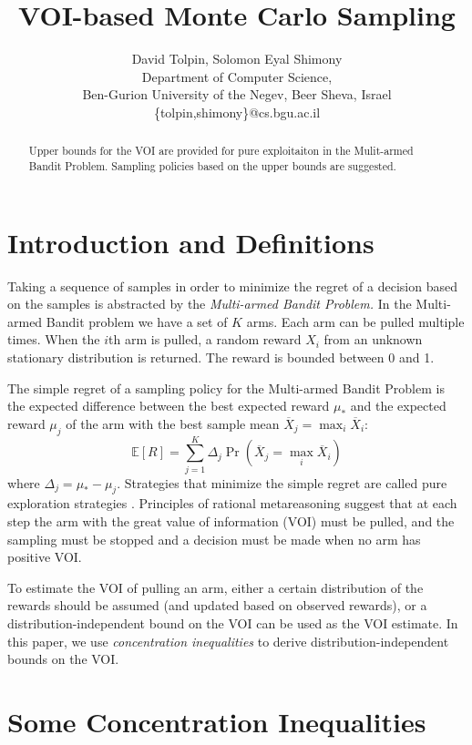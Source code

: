 \documentclass{article}
\title{VOI-based Monte Carlo Sampling}
\author {David Tolpin, Solomon Eyal Shimony \\
Department of Computer Science, \\
Ben-Gurion University of the Negev, Beer Sheva, Israel \\
\{tolpin,shimony\}@cs.bgu.ac.il}
\newcommand {\IE} {\ensuremath {\mathbb{E}}}
\begin{document}
\maketitle

\begin{abstract}
Upper bounds for the VOI are provided for pure exploitaiton in the
Mulit-armed Bandit Problem. Sampling policies based on the upper
bounds are suggested.
\end{abstract}

\section{Introduction and Definitions}

Taking a sequence of samples in order to minimize the
regret of a decision based on the samples is abstracted by the
{\em Multi-armed Bandit Problem.} In the Multi-armed Bandit problem
we have a set of $K$ arms. Each arm can be pulled multiple
times. When the $i$th arm is pulled, a random reward $X_i$ from an
unknown stationary distribution is returned.  The reward is bounded
between 0 and 1.

The simple regret of a sampling policy for the Multi-armed Bandit
Problem is the expected difference between the best expected reward
$\mu_*$ and the expected reward $\mu_j$ of the arm with the best sample mean
$\overline X_j=\max_i\overline X_i$:
\begin{equation}
\label{eq:simple-regret}
\IE[R]=\sum_{j=1}^K\Delta_j\Pr(\overline X_j=\max_i\overline X_i)
\end{equation}
where $\Delta_j=\mu_*-\mu_j$.
Strategies that minimize the simple regret are called pure exploration
strategies \cite{Bubeck.pure}. Principles of rational metareasoning
\cite{Russel.right} suggest that at each step the arm with the great
value of information (VOI) must be pulled, and the sampling must be
stopped and a decision must be made when no arm has positive VOI. 

To estimate the VOI of pulling an arm, either a certain 
distribution of the rewards should be assumed (and updated based on
observed rewards), or a distribution-independent bound on the VOI can be
used as the VOI estimate. In this paper, we use {\em concentration inequalities}
to derive distribution-independent bounds on the VOI.

\section{Some Concentration Inequalities}
\end{document}
